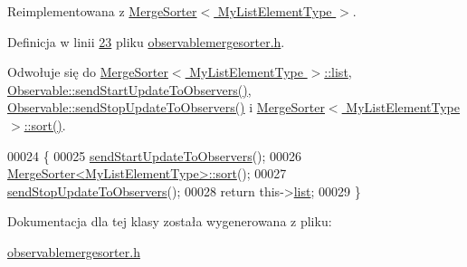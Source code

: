 Reimplementowana z \hyperlink{class_merge_sorter_aaee4333eb37af6401eca60da3398e507}{Merge\-Sorter$<$ My\-List\-Element\-Type $>$}.



Definicja w linii \hyperlink{observablemergesorter_8h_source_l00023}{23} pliku \hyperlink{observablemergesorter_8h_source}{observablemergesorter.\-h}.



Odwołuje się do \hyperlink{mergesorter_8h_source_l00018}{Merge\-Sorter$<$ My\-List\-Element\-Type $>$\-::list}, \hyperlink{observable_8h_source_l00023}{Observable\-::send\-Start\-Update\-To\-Observers()}, \hyperlink{observable_8h_source_l00030}{Observable\-::send\-Stop\-Update\-To\-Observers()} i \hyperlink{mergesorter_8h_source_l00083}{Merge\-Sorter$<$ My\-List\-Element\-Type $>$\-::sort()}.


\begin{DoxyCode}
00024         \{
00025                 \hyperlink{class_observable_a78df64057f152342a43f27979186a6ba}{sendStartUpdateToObservers}();
00026                 \hyperlink{class_merge_sorter_aaee4333eb37af6401eca60da3398e507}{MergeSorter<MyListElementType>::sort}();
00027                 \hyperlink{class_observable_a16f75ed1514a0cb7526b5a5d2b7ca7c6}{sendStopUpdateToObservers}();
00028                 \textcolor{keywordflow}{return} this->\hyperlink{class_merge_sorter_a8ac3ee938414809d7da627cf918f1f87}{list};
00029         \}
\end{DoxyCode}


Dokumentacja dla tej klasy została wygenerowana z pliku\-:\begin{DoxyCompactItemize}
\item 
\hyperlink{observablemergesorter_8h}{observablemergesorter.\-h}\end{DoxyCompactItemize}
